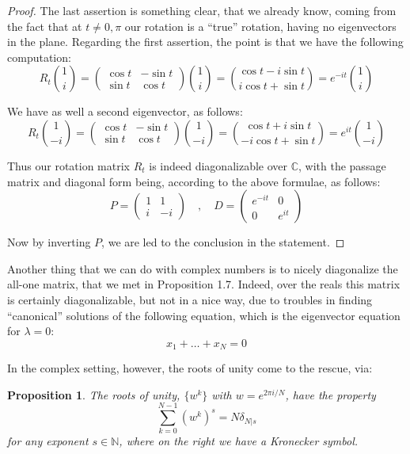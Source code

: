 \documentclass[12pt]{amsbook}
\newtheorem{proposition}[theorem]{Proposition}
\begin{document}
\begin{proof}
The last assertion is something clear, that we already know, coming from the fact that at $t\neq0,\pi$ our rotation is a ``true'' rotation, having no eigenvectors in the plane. Regarding the first assertion, the point is that we have the following computation:
$$R_t\binom{1}{i}
=\begin{pmatrix}\cos t&-\sin t\\ \sin t&\cos t\end{pmatrix}\binom{1}{i}
=\binom{\cos t-i\sin t}{i\cos t+\sin t}
=e^{-it}\binom{1}{i}$$

We have as well a second eigenvector, as follows:
$$R_t\binom{1}{-i}
=\begin{pmatrix}\cos t&-\sin t\\ \sin t&\cos t\end{pmatrix}\binom{1}{-i}
=\binom{\cos t+i\sin t}{-i\cos t+\sin t}
=e^{it}\binom{1}{-i}$$

Thus our rotation matrix $R_t$ is indeed diagonalizable over $\mathbb C$, with the passage matrix and diagonal form being, according to the above formulae, as follows:
$$P=\begin{pmatrix}1&1\\i&-i\end{pmatrix}\quad,\quad 
D=\begin{pmatrix}e^{-it}&0\\0&e^{it}\end{pmatrix}$$

Now by inverting $P$, we are led to the conclusion in the statement.
\end{proof}

Another thing that we can do with complex numbers is to nicely diagonalize the all-one matrix, that we met in Proposition 1.7. Indeed, over the reals this matrix is certainly diagonalizable, but not in a nice way, due to troubles in finding ``canonical'' solutions of the following equation, which is the eigenvector equation for $\lambda=0$:
$$x_1+\ldots+x_N=0$$

In the complex setting, however, the roots of unity come to the rescue, via:


\begin{proposition}
The roots of unity, $\{w^k\}$ with $w=e^{2\pi i/N}$, have the property
$$\sum_{k=0}^{N-1}(w^k)^s=N\delta_{N|s}$$
for any exponent $s\in\mathbb N$, where on the right we have a Kronecker symbol.
\end{proposition}
\end{document}
